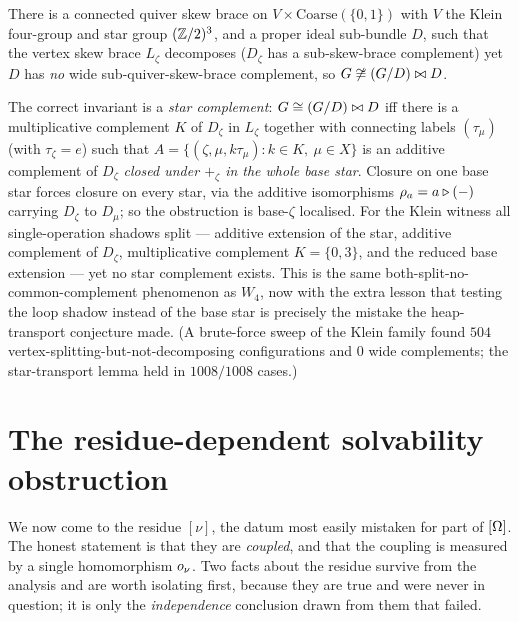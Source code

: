 \begin{theorem}
\label{thm:heap-refute}
There is a connected quiver skew brace on $V\times\mathrm{Coarse}(\{0,1\})$ with
$V$ the Klein four-group and star group $(\mathbb{Z}/2)^3$, and a proper ideal sub-bundle
$D$, such that the vertex skew brace $L_\zeta$ decomposes ($D_\zeta$ has a
sub-skew-brace complement) yet $D$ has \emph{no} wide sub-quiver-skew-brace
complement, so $G\not\cong(G/D)\bowtie D$.
\end{theorem}

The correct invariant is a \emph{star complement}: $G\cong(G/D)\bowtie D$ iff there is
a multiplicative complement $K$ of $D_\zeta$ in $L_\zeta$ together with connecting
labels $(\tau_\mu)$ (with $\tau_\zeta=e$) such that
$A=\{(\zeta,\mu,k\tau_\mu):k\in K,\ \mu\in X\}$ is an additive complement of
$D_\zeta$ \emph{closed under $+_\zeta$ in the whole base star}. Closure on one base
star forces closure on every star, via the additive isomorphisms
$\rho_a=a\triangleright(-)$ carrying $D_\zeta$ to $D_\mu$; so the obstruction is base-$\zeta$
localised. For the Klein witness all single-operation shadows split --- additive
extension of the star, additive complement of $D_\zeta$, multiplicative complement
$K=\{0,3\}$, and the reduced base extension --- yet no star complement exists. This
is the same both-split-no-common-complement phenomenon as $W_4$, now with the extra
lesson that testing the loop shadow instead of the base star is precisely the
mistake the heap-transport conjecture made. (A brute-force sweep of the Klein
family found $504$ vertex-splitting-but-not-decomposing configurations and $0$ wide
complements; the star-transport lemma held in $1008/1008$ cases.)

\section{The residue-dependent solvability obstruction}\label{sec:omega-onu}

We now come to the residue $[\nu]$, the datum most easily mistaken for part of
$[\Omega]$. The honest statement is that they are \emph{coupled}, and that the coupling
is measured by a single homomorphism $o_\nu$. Two facts about the residue survive
from the analysis and are worth isolating first, because they are true and were
never in question; it is only the \emph{independence} conclusion drawn from them
that failed.

